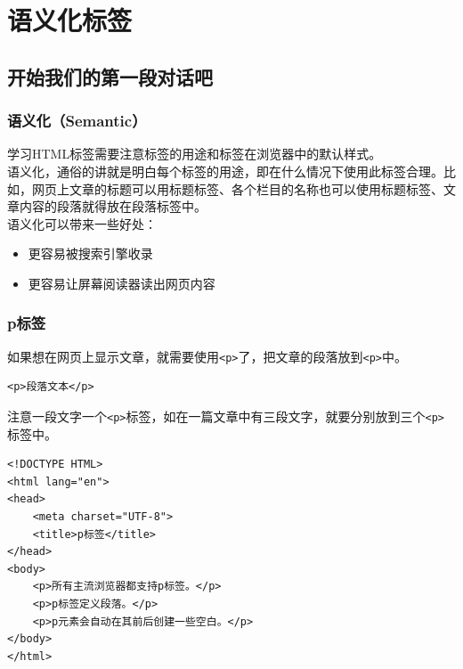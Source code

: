 \chapter{语义化标签}

\section{开始我们的第一段对话吧}

\subsection{语义化（Semantic）}

学习HTML标签需要注意标签的用途和标签在浏览器中的默认样式。 \\

语义化，通俗的讲就是明白每个标签的用途，即在什么情况下使用此标签合理。比如，网页上文章的标题可以用标题标签、各个栏目的名称也可以使用标题标签、文章内容的段落就得放在段落标签中。 \\

语义化可以带来一些好处：

\begin{itemize}
    \item 更容易被搜索引擎收录
    \item 更容易让屏幕阅读器读出网页内容
\end{itemize}

\subsection{p标签}

如果想在网页上显示文章，就需要使用\lstinline|<p>|了，把文章的段落放到\lstinline|<p>|中。 \\

\begin{lstlisting}[style=htmlcssjs]
<p>段落文本</p>
\end{lstlisting}

注意一段文字一个\lstinline|<p>|标签，如在一篇文章中有三段文字，就要分别放到三个\lstinline|<p>|标签中。

\begin{lstlisting}[style=htmlcssjs, title=p标签]
<!DOCTYPE HTML>
<html lang="en">
<head>
    <meta charset="UTF-8">
    <title>p标签</title>
</head>
<body>
    <p>所有主流浏览器都支持p标签。</p>
    <p>p标签定义段落。</p>
    <p>p元素会自动在其前后创建一些空白。</p>
</body>
</html>
\end{lstlisting}

